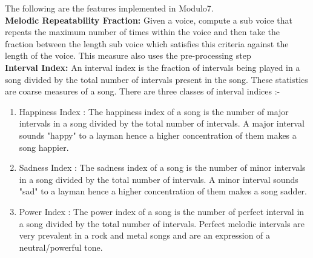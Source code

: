 \noindent The following are the features implemented in Modulo7.  \\

\noindent \textbf{Melodic Repeatability Fraction: } Given a voice, compute a sub voice that repeats the maximum number of times within the voice and then take the fraction between the length sub voice which satisfies this criteria against the length of the voice. This measure also uses the pre-processing step \\

\noindent \textbf{Interval Index: } An interval index is the fraction of intervals being played in a song divided by the total number of intervals present in the song. These statistics are coarse measures of a song. There are three classes of interval indices :-

\begin{enumerate}
\item Happiness Index : The happiness index of a song is the number of major intervals in a song divided by the total number of intervals. A major interval sounds "happy" to a layman hence a higher concentration of them makes a song happier. 
\item Sadness Index : The sadness index of a song is the number of minor intervals in a song divided by the total number of intervals. A minor interval sounds "sad" to a layman hence a higher concentration of them makes a song sadder. 
\item Power Index : The power index of a song is the number of perfect interval in a song divided by the total number of intervals. Perfect melodic intervals are very prevalent in a rock and metal songs and are an expression of a neutral/powerful tone. 
\end{enumerate}